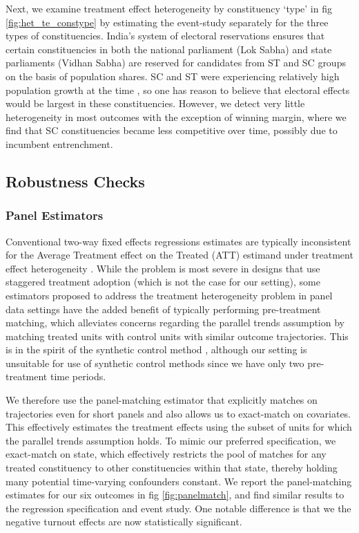 Next, we examine treatment effect heterogeneity by constituency `type'
in fig \ref{fig:het_te_constype} by estimating the event-study
separately for the three types of constituencies. India's system of
electoral reservations ensures that certain constituencies in both the
national parliament (Lok Sabha) and state parliaments (Vidhan Sabha)
are reserved for candidates from ST and SC groups on the basis of
population shares. SC and ST were experiencing relatively high
population growth at the time \parencite{kulkarni2005population}, so
one has reason to believe that electoral effects would be largest in
these constituencies. However, we detect very little heterogeneity in
most outcomes with the exception of winning margin, where we find that
SC constituencies became less competitive over time, possibly due to
incumbent entrenchment.

\subsection{Robustness Checks}

\subsubsection{Panel Estimators} %
Conventional two-way fixed effects regressions estimates are typically
inconsistent for the Average Treatment effect on the Treated (ATT)
estimand under treatment effect heterogeneity
\parencite{SantAnna2020-ly,Imai2020-dg}. While the problem is most
severe in designs that use staggered treatment adoption (which is not
the case for our setting), some estimators proposed to address the
treatment heterogeneity problem in panel data settings have the added
benefit of typically performing pre-treatment matching, which
alleviates concerns regarding the parallel trends assumption by
matching treated units with control units with similar outcome
trajectories. This is in the spirit of the synthetic control method
\parencite{abadie2010synthetic}, although our setting is unsuitable
for use of synthetic control methods since we have only two
pre-treatment time periods.

We therefore use the panel-matching estimator
\parencite{imai2019should} that explicitly matches on
trajectories even for short panels and also allows us to exact-match
on covariates. This effectively estimates the treatment effects using
the subset of units for which the parallel trends assumption holds. To
mimic our preferred specification, we exact-match on state, which
effectively restricts the pool of matches for any treated constituency
to other constituencies within that state, thereby holding many
potential time-varying confounders constant. We report the
panel-matching estimates for our six outcomes in fig
\ref{fig:panelmatch}, and find similar results to the regression
specification and event study. One notable difference is that we the
negative turnout effects are now statistically significant.

